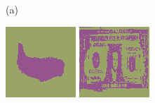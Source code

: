 \documentclass{article}
\begin{document}
\begin{figure}[t]
  \centering
  \begin{minipage}[c]{.1\linewidth}
    \centering\centerline{(a)}
  \end{minipage}
  \begin{minipage}[c]{.21\linewidth}
    \centering\centerline{\includegraphics[width=\linewidth]{imgs/dennis_cal/airplane/products/0.png}}
  \end{minipage}
  \begin{minipage}[c]{.21\linewidth}
    \centering\centerline{\includegraphics[width=\linewidth]{imgs/dennis_cal/dollar/products/0.png}}

\end{minipage}
\end{figure}
\end{document}
